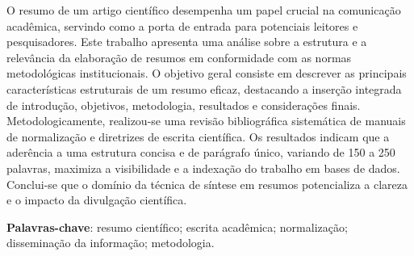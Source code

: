 
\imprimircapa

\imprimirfolhaderosto*


\imprimircabecalhoartigo

\setlength{\absparsep}{18pt} %

\begin{resumo}
    O resumo de um artigo científico desempenha um papel crucial na comunicação acadêmica, servindo como a porta de entrada para potenciais leitores e pesquisadores. Este trabalho apresenta uma análise sobre a estrutura e a relevância da elaboração de resumos em conformidade com as normas metodológicas institucionais. O objetivo geral consiste em descrever as principais características estruturais de um resumo eficaz, destacando a inserção integrada de introdução, objetivos, metodologia, resultados e considerações finais. Metodologicamente, realizou-se uma revisão bibliográfica sistemática de manuais de normalização e diretrizes de escrita científica. Os resultados indicam que a aderência a uma estrutura concisa e de parágrafo único, variando de 150 a 250 palavras, maximiza a visibilidade e a indexação do trabalho em bases de dados. Conclui-se que o domínio da técnica de síntese em resumos potencializa a clareza e o impacto da divulgação científica.
    
    \vspace{\onelineskip}
    \noindent
    \textbf{Palavras-chave}: resumo científico; escrita acadêmica; normalização; disseminação da informação; metodologia.
\end{resumo}

